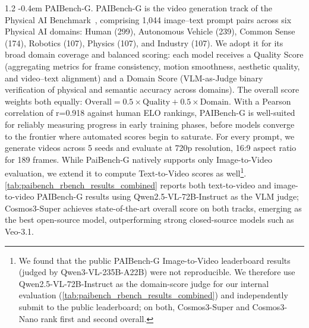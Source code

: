 \documentclass{llmxive}
\makeatletter
\providecommand{\paragraph}{  \@startsection{paragraph}{4}{\z@}    {1\baselineskip \@plus .2\baselineskip}    {-0.4em}    {\normalfont\normalsize\bfseries}}
\makeatother
\begin{document}
\paragraph{PAIBench-G.} PAIBench-G is the video generation track of the Physical AI Benchmark~\citep{zhou2025paibench}, comprising 1,044 image–text prompt pairs across six Physical AI domains: Human (299), Autonomous Vehicle (239), Common Sense (174), Robotics (107), Physics (107), and Industry (107). We adopt it for its broad domain coverage and balanced scoring: each model receives a Quality Score (aggregating metrics for frame consistency, motion smoothness, aesthetic quality, and video–text alignment) and a Domain Score (VLM-as-Judge binary verification of physical and semantic accuracy across domains). The overall score weights both equally: $\text{Overall} = 0.5 \times \text{Quality} + 0.5 \times \text{Domain}$. With a Pearson correlation of
r=0.918 against human ELO rankings, PAIBench-G is well-suited for reliably measuring progress in early training phases, before models converge to the frontier where automated scores begin to saturate. For every prompt, we generate videos across 5 seeds and evaluate at 720p resolution, 16:9 aspect ratio for 189 frames. While PaiBench-G natively supports only Image-to-Video evaluation, we extend it to compute Text-to-Video scores as well\footnote{We found that the public PAIBench-G Image-to-Video leaderboard results (judged by Qwen3-VL-235B-A22B) were not reproducible. We therefore use Qwen2.5-VL-72B-Instruct as the domain-score judge for our internal evaluation (\cref{tab:paibench_rbench_results_combined}) and independently submit to the public leaderboard; on both, Cosmos3-Super and Cosmos3-Nano rank first and second overall.}. \cref{tab:paibench_rbench_results_combined} reports both text-to-video and image-to-video PAIBench-G results using Qwen2.5-VL-72B-Instruct as the VLM judge; Cosmos3-Super achieves state-of-the-art overall score on both tracks, emerging as the best open-source model, outperforming strong closed-source models such as Veo-3.1.
\end{document}
